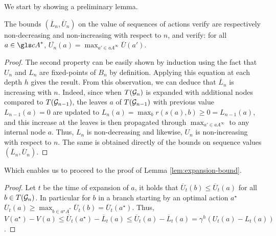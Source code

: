 \begin{subappendices}
We start by showing a preliminary lemma.
\begin{lemma}
	\begin{leftbar}[lemmabar]
	\label{lem:bounds}
	The bounds $(\overline{L}_n, \overline{U}_n)$ on the value of sequences of actions verify are respectively non-decreasing and non-increasing with respect to $n$, and verify: for all $a\in \cA^*$, $\overline{U_n}(a) = \max_{a'\in a A^\infty} \overline{U}(a')$.
	\end{leftbar}
\end{lemma}
\begin{proof}
	The second property can be easily shown by induction using the fact that $U_n$ and $L_n$ are fixed-points of $B_n$ by definition. Applying this equation at each depth $h$ gives the result. From this observation, we can deduce that $\overline{L}_n$ is increasing with $n$. Indeed, since when $T(\mathcal{G}_n)$ is expanded with additional nodes compared to $T(\mathcal{G}_{n-1})$, the leaves $a$ of $T(\mathcal{G}_{n-1})$ with previous value $L_{n-1}(a)=0$ are updated to $L_n(a) = \max_b r(s(a), b) \geq 0 = L_{n-1}(a)$, and this increase at the leaves is then propagated through $\max_{a'\in a A^\infty}$ to any internal node $a$. Thus, $L_n$ is non-decreasing and likewise, $U_n$ is non-increasing with respect to $n$. The same is obtained directly of the bounds on sequence values $(\overline{L}_n, \overline{U}_n)$.
\end{proof}

Which enables us to proceed to the proof of Lemma \ref{lem:expansion-bound}.
\begin{proof}
	Let $t$ be the time of expansion of $a$, it holds that $\overline{U}_t(b) \leq \overline{U}_t(a)$ for all $b\in T(\mathcal{G}_n)$. In particular for $b$ in a branch starting by an optimal action $a^\star$ $\overline{U}_t(a) \geq \max_{b\in a^\star A^*}  \overline{U}_t(b) = \overline{U}_t(a^\star)$. Thus, $V(a^\star)-V(a) \leq \overline{U}_t(a^\star) - \overline{L}_t(a) \leq \overline{U}_t(a) - \overline{L}_t(a) = \gamma^h(U_t(a)-L_t(a))$.
\end{proof}


\end{subappendices}
